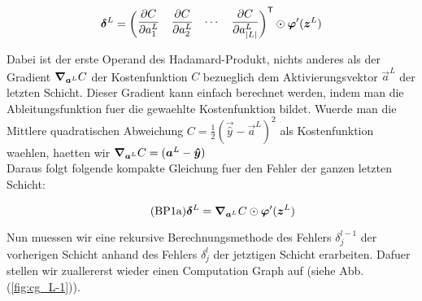 \begin{equation*}
  \bm{\delta}^L = \begin{pmatrix} \displaystyle\frac{\partial C}{\partial a_1^L} & \displaystyle\frac{\partial C}{\partial a_2^L} & \cdots & \displaystyle\frac{\partial C}{\partial a_{|L|}^L}\end{pmatrix}^{\mathsf{T}} \odot \bm{\varphi}'(\bm{z}^L)
\end{equation*}

Dabei ist der erste Operand des Hadamard-Produkt, nichts anderes als
der Gradient $\bm{\nabla}_{\bm{a}^L} C$ der Kostenfunktion $C$ bezueglich dem Aktivierungsvektor
$\vec{a}^L$ der letzten Schicht. Dieser Gradient kann einfach berechnet werden, indem man die
Ableitungsfunktion fuer die gewaehlte Kostenfunktion bildet. Wuerde man die
Mittlere quadratischen Abweichung $C = \frac{1}{2}(\vec{\hat{y}} - \vec{a}^L)^2$ als Kostenfunktion waehlen, haetten wir
$\bm{\nabla}_{\bm{a}^L} C = (\bm{a}^L - \bm{\hat{y}})$  \\
Daraus folgt folgende kompakte Gleichung fuer den Fehler der ganzen letzten Schicht:

\begin{equation}\tag{BP1a}
  \bm{\delta}^L = \bm{\nabla}_{\bm{a}^L}C \odot \bm{\varphi}'(\bm{z}^L)
\end{equation}

\para{}
Nun muessen wir eine rekursive Berechnungsmethode des Fehlers $\delta_j^{l-1}$
der vorherigen Schicht anhand des Fehlers $\delta_j^l$ der jetztigen Schicht
erarbeiten. Dafuer stellen wir zuallererst wieder einen Computation Graph auf
(siehe Abb. (\ref{fig:cg_L-1})).

